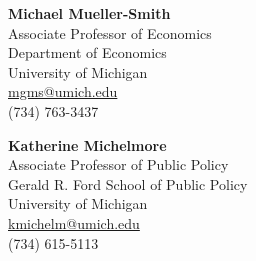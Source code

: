 \documentclass[12pt,letterpaper]{article}
\begin{document}
\vspace{0.3cm}
\begin{minipage}[t]{0.49\textwidth}
\textbf{Michael Mueller-Smith}\\
Associate Professor of Economics\\
Department of Economics\\
University of Michigan\\
\href{mailto:mgms@umich.edu}{mgms@umich.edu}\\
(734) 763-3437
\end{minipage}
\hfill
\begin{minipage}[t]{0.49\textwidth}
\textbf{Katherine Michelmore}\\
Associate Professor of Public Policy\\
Gerald R. Ford School of Public Policy\\
University of Michigan\\
\href{mailto:kmichelm@umich.edu}{kmichelm@umich.edu}\\
(734) 615-5113
\end{minipage}
\end{document}

